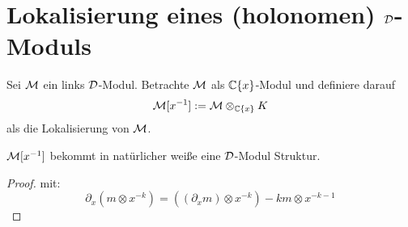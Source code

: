\section{Lokalisierung eines (holonomen) $\mathcal{D}$-Moduls}
\cite[Chap 4.2.]{sabbah_cimpa90}
Sei $\mathcal{M}$ ein links $\mathcal{D}$-Modul. Betrachte $\mathcal{M}$ als $\mathbb{C}\{x\}$-Modul und
definiere darauf
\[ \mathcal{M}[x^{-1}]:=\mathcal{M}\otimes_{\mathbb{C}\{x\}}K \]
als die Lokalisierung von $\mathcal{M}$.
\begin{prop} \cite[Prop 4.2.1.]{sabbah_cimpa90}
$\mathcal{M}[x^{-1}]$ bekommt in natürlicher weiße eine $\mathcal{D}$-Modul Struktur.
\end{prop}
\begin{proof} \cite[Prop 4.2.1.]{sabbah_cimpa90}
mit:
\[
\partial_x(m\otimes x^{-k})=((\partial_xm)\otimes x^{-k})-km\otimes x^{-k-1}
\]
\begin{comment}
beweis der $\cD$-linearität ist als übung gelassen
\end{comment}
\end{proof}


